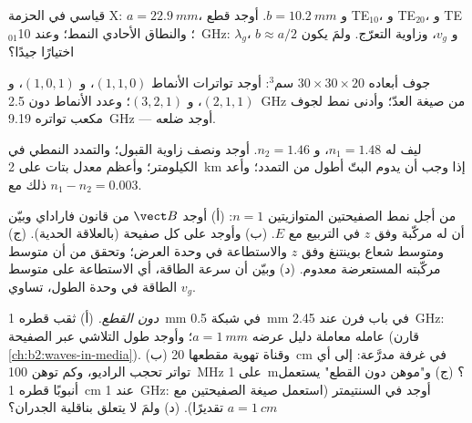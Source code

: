 \begin{exercise}[$\star$]\label{exo:b2:guided-waves:2}
 قياسي في الحزمة X: $a = \qty{22.9}{mm}$، و $b = \qty{10.2}{mm}$.
أوجد قطع TE$_{10}$، و TE$_{20}$، و TE$_{01}$؛ والنطاق الأحادي النمط؛ وعند
\qty{10}{GHz}: $\lambda_g$، و $v_g$، وزاوية التعرّج. ولمَ يكون $b \approx a/2$
اختيارًا جيدًا؟
\end{exercise}

\begin{exercise}[$\star$]\label{exo:b2:guided-waves:3}
جوف أبعاده $30 \times 30 \times 20$ سم$^3$: أوجد تواترات الأنماط $(1,1,0)$،
و $(1,0,1)$، و $(2,1,1)$، و $(3,2,1)$؛ وعدد الأنماط دون \qty{2.5}{GHz} من
صيغة العدّ؛ وأدنى نمط لجوف مكعب تواتره \qty{9.19}{GHz}
--- أوجد ضلعه.
\end{exercise}

\begin{exercise}[$\star$]\label{exo:b2:guided-waves:4}
ليف له $n_1 = 1.48$، و $n_2 = 1.46$. أوجد  ونصف زاوية
القبول؛ والتمدد النمطي في الكيلومتر؛ وأعظم معدل بتات على
\qty{2}{km} إذا وجب أن يدوم البتّ أطول من التمدد؛ وأعد ذلك مع
$n_1 - n_2 = 0.003$.
\end{exercise}

\begin{exercise}[$\star\star$]\label{exo:b2:guided-waves:5}
من أجل نمط الصفيحتين المتوازيتين $n = 1$: (أ) أوجد $\vect B$ من قانون
فاراداي وبيّن أن له مركّبة وفق $z$ في التربيع مع $E$. (ب) وأوجد  على كل صفيحة (بالعلاقة الحدية). (ج) ومتوسط شعاع بوينتنغ
وفق $z$ والاستطاعة في وحدة العرض؛ وتحقق من أن متوسط مركّبته
المستعرضة معدوم. (د) وبيّن أن سرعة الطاقة، أي الاستطاعة
على متوسط الطاقة في وحدة الطول، تساوي $v_g$.
\end{exercise}

\begin{exercise}[$\star\star$]\label{exo:b2:guided-waves:6}
\emph{دون القطع.} (أ) ثقب قطره \qty{1}{mm} في شبكة \qty{0.5}{mm} في باب
فرن عند \qty{2.45}{GHz}: عامله معاملة دليل عرضه $a = \qty{1}{mm}$؛
وأوجد طول التلاشي  عبر الصفيحة  (قارن
\cref{ch:b2:waves-in-media}). (ب) وقناة تهوية مقطعها \qty{20}{cm}
في غرفة مدرَّعة: إلى أي تواتر تحجب الراديو،
وكم توهن \qty{100}{MHz} على \qty{1}{m}؟ (ج) و"موهن 
دون القطع" يستعمل أنبوبًا قطره \qty{1}{cm} عند
\qty{1}{GHz}: أوجد  في السنتيمتر (استعمل صيغة الصفيحتين مع $a =
\qty{1}{cm}$ تقديرًا). (د) ولمَ لا يتعلق 
بناقلية الجدران؟
\end{exercise}

